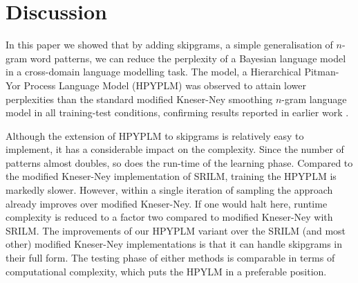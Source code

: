\section{Discussion}
In this paper we showed that by adding skipgrams, a simple generalisation of $n$-gram word patterns, we can reduce the perplexity of a Bayesian language model in a cross-domain language modelling task. The model, a Hierarchical Pitman-Yor Process Language Model (HPYPLM) was observed to attain lower perplexities than the standard modified Kneser-Ney smoothing $n$-gram language model in all training-test conditions, confirming results reported in earlier work \autocite{teh2006hierarchical}.

Although the extension of HPYPLM to skipgrams is relatively easy to implement, it has a considerable impact on the complexity. Since the number of patterns almost doubles, so does the run-time of the learning phase. Compared to the modified Kneser-Ney implementation of SRILM, training the HPYPLM is markedly slower. However, within a single iteration of sampling the approach already improves over modified Kneser-Ney. If one would halt here, runtime complexity is reduced to a factor two compared to modified Kneser-Ney with SRILM. The improvements of our HPYPLM variant over the SRILM (and most other) modified Kneser-Ney implementations is that it can handle skipgrams in their full form. The testing phase of either methods is comparable in terms of computational complexity, which puts the HPYLM in a preferable position.
